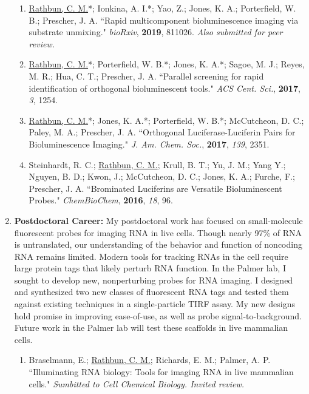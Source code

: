 \documentclass{nihbiosketch}
\begin{document}
\begin{enumerate}
\begin{enumerate}
\item \underline{Rathbun, C. M.}*; Ionkina, A. I.*; Yao, Z.; Jones, K. A.; Porterfield, W. B.; Prescher, J. A. ``Rapid multicomponent bioluminescence imaging via substrate unmixing." \textit{bioRxiv}, \textbf{2019}, 811026. \textit{Also submitted for peer review.}

  \item \underline{Rathbun, C. M.}*; Porterfield, W. B.*; Jones, K. A.*; Sagoe, M. J.; Reyes, M. R.; Hua, C. T.; Prescher, J. A. ``Parallel screening for rapid identification of orthogonal bioluminescent tools." \textit{ACS Cent. Sci.}, \textbf{2017}, \textit{3}, 1254.


  \item \underline{Rathbun, C. M.}*; Jones, K. A.*; Porterfield, W. B.*; McCutcheon, D. C.; Paley, M. A.; Prescher, J. A. ``Orthogonal Luciferase-Luciferin Pairs for Bioluminescence Imaging." \textit{J. Am. Chem. Soc.}, \textbf{2017}, \textit{139}, 2351.

  \item Steinhardt, R. C.; \underline{Rathbun, C. M.}; Krull, B. T.; Yu, J. M.; Yang Y.; Nguyen, B. D.; Kwon, J.; McCutcheon, D. C.; Jones, K. A.; Furche, F.; Prescher, J. A. ``Brominated Luciferins are Versatile Bioluminescent Probes." \textit{ChemBioChem}, \textbf{2016}, \textit{18}, 96.

\end{enumerate}

\item \textbf{Postdoctoral Career:} My postdoctoral work has focused on small-molecule fluorescent probes for imaging RNA in live cells. Though nearly 97\% of RNA is untranslated, our understanding of the behavior and function of noncoding RNA remains limited. Modern tools for tracking RNAs in the cell require large protein tags that likely perturb RNA function. In the Palmer lab, I sought to develop new, nonperturbing probes for RNA imaging. I designed and synthesized two new classes of fluorescent RNA tags and tested them against existing techniques in a single-particle TIRF assay. My new designs hold promise in improving ease-of-use, as well as probe signal-to-background. Future work in the Palmer lab will test these scaffolds in live mammalian cells.
\begin{enumerate}
	\item Braselmann, E.; \underline{Rathbun, C. M.}; Richards, E. M.; Palmer, A. P. ``Illuminating RNA biology: Tools for imaging RNA in live mammalian cells." \textit{Sumbitted to Cell Chemical Biology. Invited review.}
\end{enumerate}

\end{enumerate}
\end{document}
